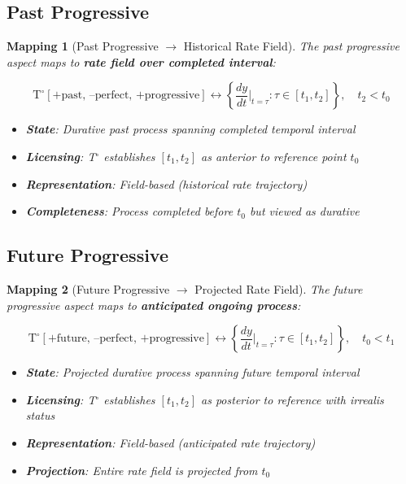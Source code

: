 \documentclass[11pt]{article}
\theoremstyle{defstyle}
\theoremstyle{mapstyle}
\newtheorem{mapping}{Mapping}[section]
\begin{document}
\subsection{Past Progressive}

\begin{mapping}[Past Progressive $\to$ Historical Rate Field]
The past progressive aspect maps to \textbf{rate field over completed interval}:

\[
\boxed{\mathrm{T}^\circ[\text{+past, --perfect, +progressive}] \longleftrightarrow \left\{\frac{dy}{dt}\Big|_{t=\tau} : \tau \in [t_1, t_2]\right\}, \quad t_2 < t_0}
\]

\begin{itemize}
\item \textbf{State}: Durative past process spanning completed temporal interval
\item \textbf{Licensing}: T$^\circ$ establishes $[t_1, t_2]$ as anterior to reference point $t_0$
\item \textbf{Representation}: Field-based (historical rate trajectory)
\item \textbf{Completeness}: Process completed before $t_0$ but viewed as durative
\end{itemize}
\end{mapping}

\subsection{Future Progressive}

\begin{mapping}[Future Progressive $\to$ Projected Rate Field]
The future progressive aspect maps to \textbf{anticipated ongoing process}:

\[
\boxed{\mathrm{T}^\circ[\text{+future, --perfect, +progressive}] \longleftrightarrow \left\{\frac{dy}{dt}\Big|_{t=\tau} : \tau \in [t_1, t_2]\right\}, \quad t_0 < t_1}
\]

\begin{itemize}
\item \textbf{State}: Projected durative process spanning future temporal interval
\item \textbf{Licensing}: T$^\circ$ establishes $[t_1, t_2]$ as posterior to reference with irrealis status
\item \textbf{Representation}: Field-based (anticipated rate trajectory)
\item \textbf{Projection}: Entire rate field is projected from $t_0$
\end{itemize}
\end{mapping}
\end{document}
